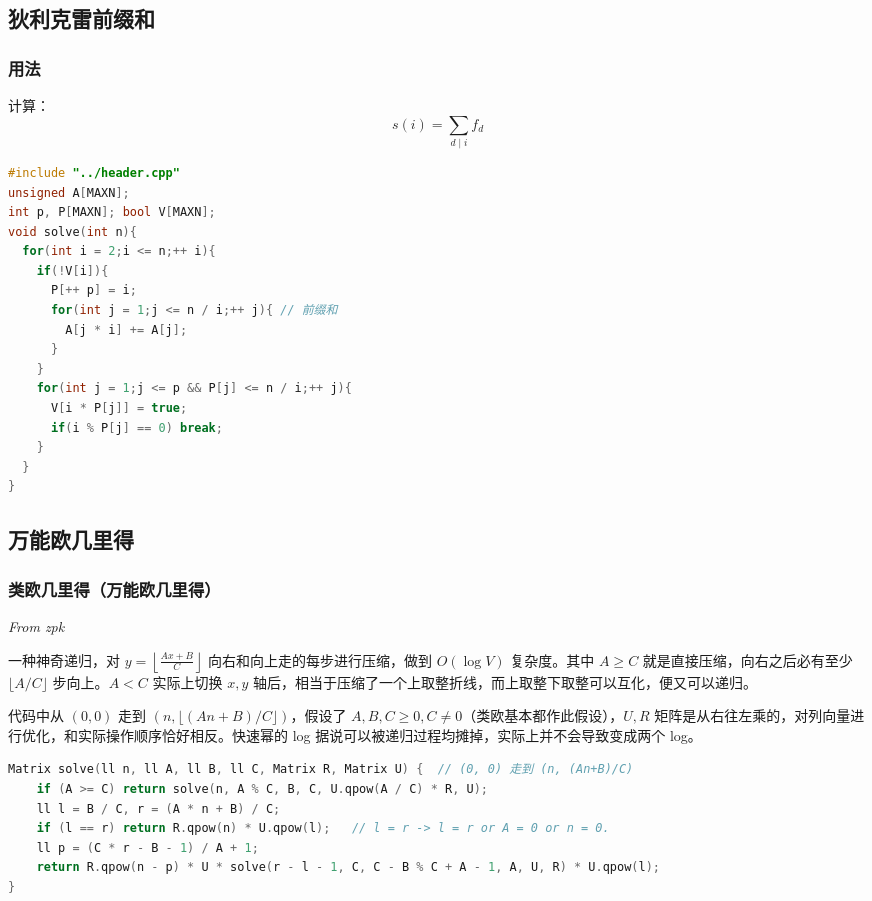 \documentclass[10pt]{ctexart}
\begin{document}
\begin{multicols}{3}
    \subsection{狄利克雷前缀和}\label{ux72c4ux5229ux514bux96f7ux524dux7f00ux548c}

    \subsubsection{用法}\label{ux7528ux6cd5-5}

    计算：\[s(i) = \sum_{d\mid i} f_{d}\]

\begin{lstlisting}[language={C++}]
#include "../header.cpp"
unsigned A[MAXN];
int p, P[MAXN]; bool V[MAXN];
void solve(int n){
  for(int i = 2;i <= n;++ i){
    if(!V[i]){
      P[++ p] = i;
      for(int j = 1;j <= n / i;++ j){ // 前缀和
        A[j * i] += A[j];
      }
    }
    for(int j = 1;j <= p && P[j] <= n / i;++ j){
      V[i * P[j]] = true;
      if(i % P[j] == 0) break;
    }
  }
}
\end{lstlisting}

    \subsection{万能欧几里得}\label{ux4e07ux80fdux6b27ux51e0ux91ccux5f97}

    \subsubsection{类欧几里得（万能欧几里得）}\label{ux7c7bux6b27ux51e0ux91ccux5f97ux4e07ux80fdux6b27ux51e0ux91ccux5f97}

    \emph{From zpk}

    一种神奇递归，对
    \(\displaystyle y=\left\lfloor \frac{Ax+B}{C}\right\rfloor\)
    向右和向上走的每步进行压缩，做到 \(O(\log V)\) 复杂度。其中
    \(A\ge C\) 就是直接压缩，向右之后必有至少 \(\lfloor A/C\rfloor\)
    步向上。\(A<C\) 实际上切换 \(x,y\)
    轴后，相当于压缩了一个上取整折线，而上取整下取整可以互化，便又可以递归。

    代码中从 \((0,0)\) 走到 \((n,\lfloor (An+B)/C\rfloor)\)，假设了
    \(A,B,C\ge 0,C\neq 0\)（类欧基本都作此假设），\(U,R\)
    矩阵是从右往左乘的，对列向量进行优化，和实际操作顺序恰好相反。快速幂的
    log 据说可以被递归过程均摊掉，实际上并不会导致变成两个 log。

\begin{lstlisting}[language={C++}]
Matrix solve(ll n, ll A, ll B, ll C, Matrix R, Matrix U) {  // (0, 0) 走到 (n, (An+B)/C)
    if (A >= C) return solve(n, A % C, B, C, U.qpow(A / C) * R, U);
    ll l = B / C, r = (A * n + B) / C;
    if (l == r) return R.qpow(n) * U.qpow(l);   // l = r -> l = r or A = 0 or n = 0.
    ll p = (C * r - B - 1) / A + 1;
    return R.qpow(n - p) * U * solve(r - l - 1, C, C - B % C + A - 1, A, U, R) * U.qpow(l);
}
\end{lstlisting}


\end{multicols}
\end{document}
